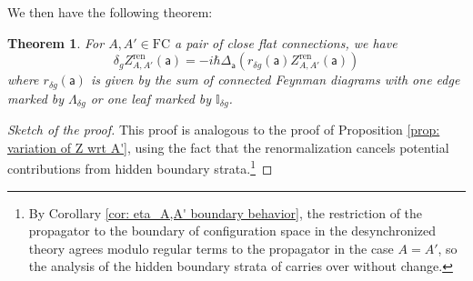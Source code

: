 \documentclass[11pt,a4paper]{amsart}
\theoremstyle{plain} %
\newtheorem{thm}{Theorem}[section]
\theoremstyle{definition}
\theoremstyle{remark}
\newcommand{\mr}{\mathrm}
\newcommand{\sfa}{\mathsf{a}}
\newcommand{\FC}{\mathrm{FC}}
\begin{document}
{We then have the following theorem:
\begin{thm}\label{thm: metric dependence}
For $A,A' \in \FC$ a pair of close flat connections, we have 
\begin{equation}\label{eq: metric dependence}
    \delta_g Z_{A,A'}^\mr{ren}(\sfa) = -i\hbar\Delta_\sfa \left(r_{\delta g}(\sfa)Z^\mr{ren}_{A,A'}(\sfa)\right)
\end{equation}
where $r_{\delta g}(\sfa)$ is given by the sum of connected Feynman diagrams with one edge marked by $\Lambda_{\delta g}$ or one leaf marked by $\mathbb{I}_{\delta g}$. 
\end{thm}
\begin{proof}[Sketch of the proof]
    This proof is analogous to the proof of Proposition \ref{prop: variation of Z wrt A'}, using %
    the fact that the renormalization cancels potential contributions from hidden boundary strata.\footnote{
    By Corollary \ref{cor: eta_A,A' boundary behavior}, the restriction of the propagator to the boundary of configuration space in the desynchronized theory agrees modulo regular terms to the propagator in the case $A=A'$, so the analysis of the hidden boundary strata of \cite{Axelrod1994} carries over without change.
    } %
\end{proof}

}
\end{document}
